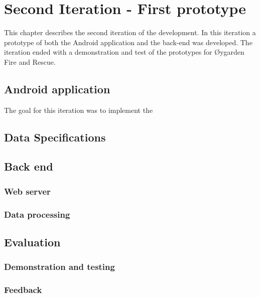 \documentclass[../Main/thesis.tex]{subfiles}
\begin{document}
\chapter{Second Iteration  - First prototype}
\label{ch:development-1}
This chapter describes the second iteration of the development.
In this iteration a prototype of both the Android application and the back-end was developed.
The iteration ended with a demonstration and test of the prototypes for Øygarden Fire and Rescue.

\section{Android application}
The goal for this iteration was to implement the 

\section{Data Specifications}
\section{Back end}
\subsection{Web server}
\subsection{Data processing}

\section{Evaluation}
\subsection{Demonstration and testing}
\subsection{Feedback}
\end{document}
